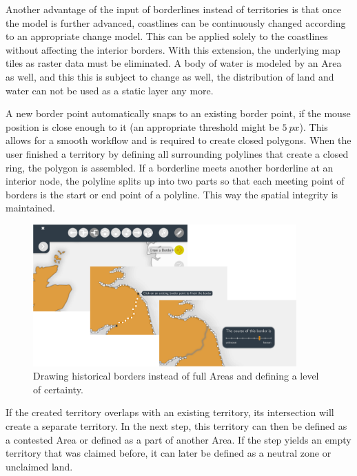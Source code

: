 Another advantage of the input of borderlines instead of territories is that once the model is further advanced, coastlines can be continuously changed according to an appropriate change model. This can be applied solely to the coastlines without affecting the interior borders. With this extension, the underlying map tiles as raster data must be eliminated. A body of water is modeled by an Area as well, and this this is subject to change as well, the distribution of land and water can not be used as a static layer any more.

A new border point automatically snaps to an existing border point, if the mouse position is close enough to it (an appropriate threshold might be $5~px$). This allows for a smooth workflow and is required to create closed polygons. When the user finished a territory by defining all surrounding polylines that create a closed ring, the polygon is assembled. If a borderline meets another borderline at an interior node, the polyline splits up into two parts so that each meeting point of borders is the start or end point of a polyline. This way the spatial integrity is maintained.

\begin{figure}[ht]
  \vspace{1em}
  \centering
  \includegraphics[width = 0.9\textwidth]{graphics/extensions/new_territory_tool}
  \caption{Drawing historical borders instead of full Areas and defining a level of certainty.}
  \label{fig:uncertainty_new_territory_tool}
\end{figure}

If the created territory overlaps with an existing territory, its intersection will create a separate territory. In the next step, this territory can then be defined as a contested Area or defined as a part of another Area. If the step yields an empty territory that was claimed before, it can later be defined as a neutral zone or unclaimed land.

